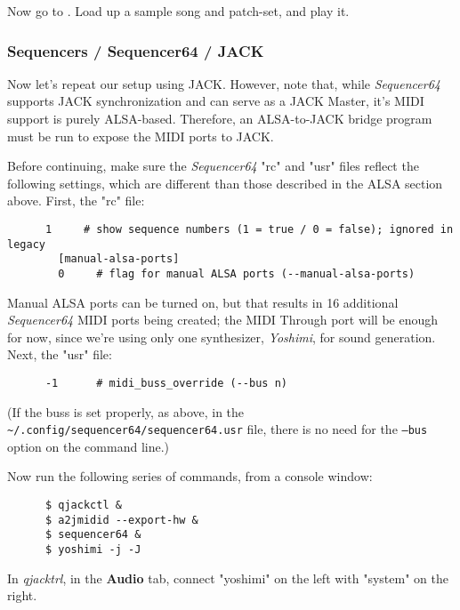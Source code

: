    Now go to .
   Load up a sample song and patch-set, and play it.

\subsubsection{Sequencers / Sequencer64 / JACK}
\label{subsubsec:sequencers_seq64_jack}

   Now let's repeat our setup using JACK.  However, note that, while
   \textsl{Sequencer64} supports JACK synchronization and can serve as a JACK
   Master, it's MIDI support is purely ALSA-based.
   Therefore, an ALSA-to-JACK bridge program must be run to expose
   the MIDI ports to JACK.
   
   Before continuing, make sure the \textsl{Sequencer64} "rc" and "usr" files
   reflect the following settings, which are different than those described in
   the ALSA section above.  First, the "rc" file:

   \begin{verbatim}
      1     # show sequence numbers (1 = true / 0 = false); ignored in legacy
		[manual-alsa-ports]
		0     # flag for manual ALSA ports (--manual-alsa-ports)
   \end{verbatim}

   Manual ALSA ports can be turned on, but that results in 16 additional
   \textsl{Sequencer64} MIDI ports being created;
   the MIDI Through port will be enough
   for now, since we're using only one synthesizer, \textsl{Yoshimi},
   for sound generation.
   Next, the "usr" file:

   \begin{verbatim}
      -1      # midi_buss_override (--bus n)
   \end{verbatim}

   (If the buss is set properly, as above, in the
   \texttt{\textasciitilde/.config/sequencer64/sequencer64.usr} file,
   there is no need for the \texttt{--bus} option on the command line.)

   Now run the following series of commands, from a console window:

   \begin{verbatim}
      $ qjackctl &
      $ a2jmidid --export-hw &
      $ sequencer64 &
      $ yoshimi -j -J 
   \end{verbatim}

   In \textsl{qjacktrl}, in the \textbf{Audio} tab, connect "yoshimi" on the
   left with "system" on the right.

